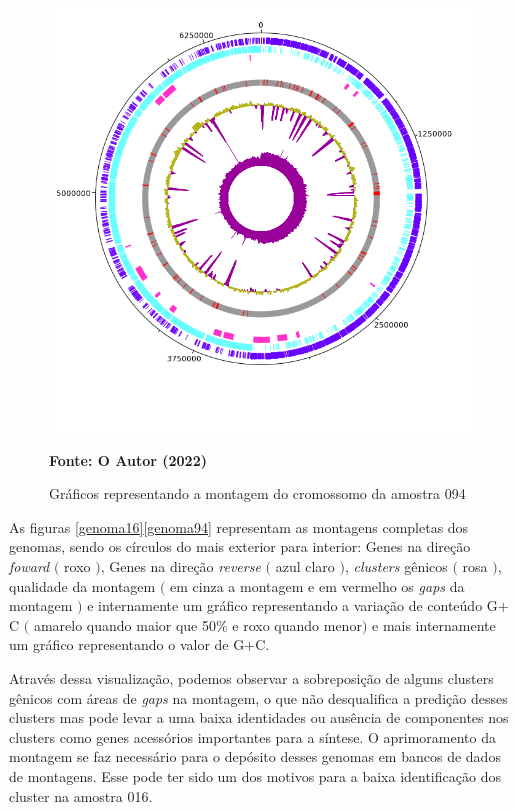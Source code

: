 \begin{figure}[H]
	\caption{Gráficos representando a montagem do cromossomo da amostra 094}
	\label{fig:genoma94}
	\centering
	\includegraphics[width=0.8\linewidth]{imagens/genome/004.png} \\
	\centering
    \begin{small}\textbf{Fonte: O Autor (2022)}\end{small}
\end{figure}
\vspace{\floatsep}

As figuras \ref{genoma16}\ref{genoma94} representam as montagens completas dos genomas, sendo
os círculos do mais exterior para interior: Genes na direção \textit{foward} $($ roxo $)$,
Genes na direção \textit{reverse} $($ azul claro $)$, \textit{clusters} gênicos $($ rosa $)$,
qualidade da montagem $($ em cinza a montagem e em vermelho os \textit{gaps} da montagem $)$ e internamente 
um gráfico representando a variação de conteúdo G$+$C $($ amarelo quando maior que 50\% e roxo quando menor$)$ e
mais internamente um gráfico representando o valor de G$+$C. 

Através dessa visualização, podemos observar a sobreposição de alguns clusters gênicos com áreas
de \textit{gaps} na montagem, o que não desqualifica a predição desses clusters mas pode levar
a uma baixa identidades ou ausência de componentes nos clusters como genes acessórios importantes
para a síntese. O aprimoramento da montagem se faz necessário para o depósito desses genomas em 
bancos de dados de montagens. Esse pode ter sido um dos motivos para a baixa identificação dos
cluster na amostra 016.
